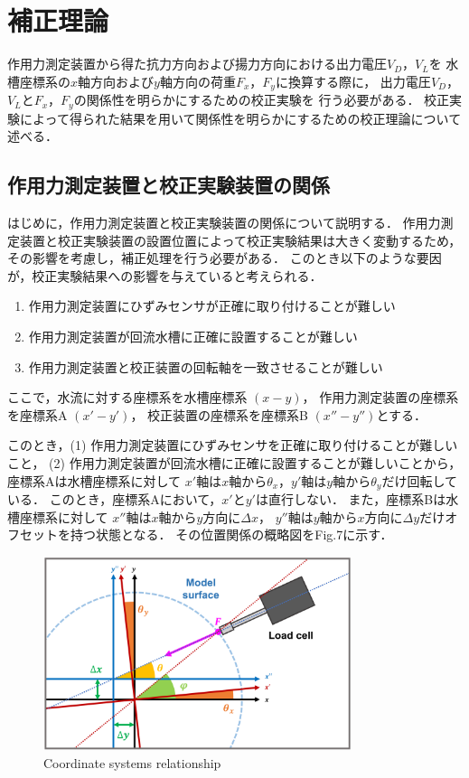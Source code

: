 \section{補正理論}
作用力測定装置から得た抗力方向および揚力方向における出力電圧$V_D$，$V_L$を
水槽座標系の$x$軸方向および$y$軸方向の荷重$F_x$，$F_y$に換算する際に，
出力電圧$V_D$，$V_L$と$F_x$，$F_y$の関係性を明らかにするための校正実験を
行う必要がある．
校正実験によって得られた結果を用いて関係性を明らかにするための校正理論について述べる．

\subsection{作用力測定装置と校正実験装置の関係}
はじめに，作用力測定装置と校正実験装置の関係について説明する．
作用力測定装置と校正実験装置の設置位置によって校正実験結果は大きく変動するため，
その影響を考慮し，補正処理を行う必要がある．
このとき以下のような要因が，校正実験結果への影響を与えていると考えられる．

\begin{enumerate}[(1)]
  \item 作用力測定装置にひずみセンサが正確に取り付けることが難しい
  \item 作用力測定装置が回流水槽に正確に設置することが難しい
  \item 作用力測定装置と校正装置の回転軸を一致させることが難しい
\end{enumerate}

ここで，水流に対する座標系を水槽座標系 $(x-y)$，
作用力測定装置の座標系を座標系A $(x'-y')$，
校正装置の座標系を座標系B $(x''-y'')$とする．

このとき，(1) 作用力測定装置にひずみセンサを正確に取り付けることが難しいこと，
(2) 作用力測定装置が回流水槽に正確に設置することが難しいことから，
座標系Aは水槽座標系に対して
$x'$軸は$x$軸から$\theta_x$，$y'$軸は$y$軸から$\theta_y$だけ回転している．
このとき，座標系Aにおいて，$x'$と$y'$は直行しない．
また，座標系Bは水槽座標系に対して
$x''$軸は$x$軸から$y$方向に$\Delta x$，
$y''$軸は$y$軸から$x$方向に$\Delta y$だけオフセットを持つ状態となる．
その位置関係の概略図をFig.7に示す．

\begin{figure}[htbp]
  \begin{center}
    \includegraphics[width=90mm]{images/31-1.png}
    \caption{Coordinate systems relationship}
  \end{center}
\end{figure}


